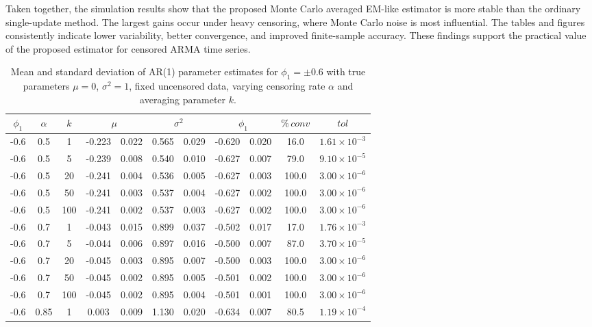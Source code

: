 \documentclass[twoside]{article}
\begin{document}
Taken together, the simulation results show that the proposed Monte Carlo averaged EM-like estimator is more stable than the ordinary single-update method. The largest gains occur under heavy censoring, where Monte Carlo noise is most influential. The tables and figures consistently indicate lower variability, better convergence, and improved finite-sample accuracy. These findings support the practical value of the proposed estimator for censored ARMA time series.
\begin{table}[htbp]
\begin{center}
\small
\caption{Mean and standard deviation of AR(1) parameter estimates for $\phi_1 = \pm0.6$ with true parameters $\mu=0$, $\sigma^2=1$, fixed uncensored data, varying censoring rate $\alpha$ and averaging parameter $k$.}
\label{tab:fixedAR11}
\begin{tabular}{|c|c|c|cc|cc|cc|c|c|}
\hline
$\phi_1$ & $\alpha$ & $k$ & \multicolumn{2}{c|}{$\mu$} & \multicolumn{2}{c|}{$\sigma^2$} & \multicolumn{2}{c|}{$\phi_1$} & $\%\,conv$ & $tol$ \\ \hline
-0.6 & 0.5 & 1 & -0.223 & 0.022 & 0.565 & 0.029 & -0.620 & 0.020 & 16.0 & $1.61\times10^{-3}$ \\
-0.6 & 0.5 & 5 & -0.239 & 0.008 & 0.540 & 0.010 & -0.627 & 0.007 & 79.0 & $9.10\times10^{-5}$ \\
-0.6 & 0.5 & 20 & -0.241 & 0.004 & 0.536 & 0.005 & -0.627 & 0.003 & 100.0 & $3.00\times10^{-6}$ \\
-0.6 & 0.5 & 50 & -0.241 & 0.003 & 0.537 & 0.004 & -0.627 & 0.002 & 100.0 & $3.00\times10^{-6}$ \\
-0.6 & 0.5 & 100 & -0.241 & 0.002 & 0.537 & 0.003 & -0.627 & 0.002 & 100.0 & $3.00\times10^{-6}$ \\ \hline
-0.6 & 0.7 & 1 & -0.043 & 0.015 & 0.899 & 0.037 & -0.502 & 0.017 & 17.0 & $1.76\times10^{-3}$ \\
-0.6 & 0.7 & 5 & -0.044 & 0.006 & 0.897 & 0.016 & -0.500 & 0.007 & 87.0 & $3.70\times10^{-5}$ \\
-0.6 & 0.7 & 20 & -0.045 & 0.003 & 0.895 & 0.007 & -0.500 & 0.003 & 100.0 & $3.00\times10^{-6}$ \\
-0.6 & 0.7 & 50 & -0.045 & 0.002 & 0.895 & 0.005 & -0.501 & 0.002 & 100.0 & $3.00\times10^{-6}$ \\
-0.6 & 0.7 & 100 & -0.045 & 0.002 & 0.895 & 0.004 & -0.501 & 0.001 & 100.0 & $3.00\times10^{-6}$ \\ \hline
-0.6 & 0.85 & 1 & 0.003 & 0.009 & 1.130 & 0.020 & -0.634 & 0.007 & 80.5 & $1.19\times10^{-4}$ \\

\end{tabular}
\end{center}
\end{table}
\end{document}
